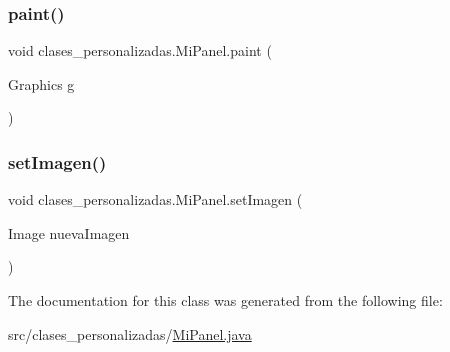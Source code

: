 \subsubsection{\texorpdfstring{paint()}{paint()}}
{\footnotesize\ttfamily void clases\+\_\+personalizadas.\+Mi\+Panel.\+paint (\begin{DoxyParamCaption}\item[{Graphics}]{g }\end{DoxyParamCaption})}

\mbox{\label{classclases__personalizadas_1_1_mi_panel_a18e1a3b7afb5e0eee1eb7439e199f8f5}} 
\subsubsection{\texorpdfstring{set\+Imagen()}{setImagen()}}
{\footnotesize\ttfamily void clases\+\_\+personalizadas.\+Mi\+Panel.\+set\+Imagen (\begin{DoxyParamCaption}\item[{Image}]{nueva\+Imagen }\end{DoxyParamCaption})}



The documentation for this class was generated from the following file\+:\begin{DoxyCompactItemize}
\item 
src/clases\+\_\+personalizadas/\mbox{\hyperlink{_mi_panel_8java}{Mi\+Panel.\+java}}\end{DoxyCompactItemize}
